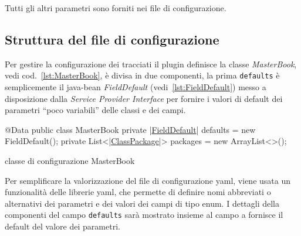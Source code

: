 \documentclass[a4paper,10pt]{report}
\newif\ifesource
\newenvironment{elisting}[1][H]
  {\captionsetup{aboveskip=0pt}\begin{listing}[#1]}
  {\end{listing}%
}
\begin{document}
Tutti gli altri parametri sono forniti nei file di configurazione.

\subsection{Struttura del file di configurazione}
Per gestire la configurazione dei tracciati il plugin definisce la classe
\textsl{MasterBook}, vedi cod.~\ref{lst:MasterBook}, è divisa in due componenti,
la prima \texttt{defaults} è semplicemente il java-bean \textsl{FieldDefault}
(vedi~\ref{lst:FieldDefault}) messo a disposizione dalla 
\textsl{Service Provider Interface} per fornire i valori di default dei 
parametri ``poco variabili'' delle classi e dei campi.

\ifesource
\begin{figure*}[!htb]
\begin{lstlisting}[language=java, caption=classe di configurazione MasterBook, 
label=lst:MasterBook]
@Data
public class MasterBook {
    private (*\hyperref[lst:FieldDefault]{FieldDefault}*) defaults = new FieldDefault();
    private List<(*\hyperref[lst:ClassPackage]{ClassPackage}*)> packages = new ArrayList<>();
}
\end{lstlisting}
\end{figure*}
\else
\begin{elisting}[!htb]
\begin{javacode}
@Data
public class MasterBook {
    private |\hyperref[lst:FieldDefault]{FieldDefault}| defaults = new FieldDefault();
    private List<|\hyperref[lst:ClassPackage]{ClassPackage}|> packages = new ArrayList<>();
}
\end{javacode}
\caption{classe di configurazione MasterBook}
\label{lst:MasterBook}
\end{elisting}
\fi

Per semplificare la valorizzazione del file di configurazione yaml, viene usata
un funzionalità delle librerie yaml, che permette di definire nomi abbreviati o
alternativi dei parametri e dei valori dei campi di tipo enum.
I dettagli della componenti del campo \texttt{defaults} sarà mostrato insieme al
campo a fornisce il default del valore dei parametri.

\iffalse
\end{document}
